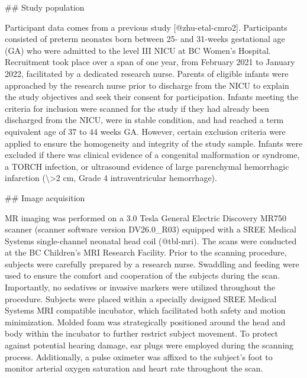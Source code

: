 \documentclass[
  letterpaper,
  DIV=11,
  numbers=noendperiod]{scrartcl}
\newenvironment{Shaded}{\begin{snugshade}}{\end{snugshade}}
\newcommand{\NormalTok}[1]{\textcolor[rgb]{0.00,0.23,0.31}{#1}}
\begin{document}
\begin{Shaded}
\begin{Highlighting}[]
\NormalTok{\#\# Study population}

\NormalTok{Participant data comes from a previous study [@zhu{-}etal{-}cmro2]. Participants consisted of preterm neonates born between 25{-} and 31{-}weeks gestational age (GA) who were admitted to the level III NICU at BC Women’s Hospital. Recruitment took place over a span of one year, from February 2021 to January 2022, facilitated by a dedicated research nurse. Parents of eligible infants were approached by the research nurse prior to discharge from the NICU to explain the study objectives and seek their consent for participation. Infants meeting the criteria for inclusion were scanned for the study if they had already been discharged from the NICU, were in stable condition, and had reached a term equivalent age of 37 to 44 weeks GA. However, certain exclusion criteria were applied to ensure the homogeneity and integrity of the study sample. Infants were excluded if there was clinical evidence of a congenital malformation or syndrome, a TORCH infection, or ultrasound evidence of large parenchymal hemorrhagic infarction (\textbackslash{}\textgreater{}2 cm, Grade 4 intraventricular hemorrhage).}

\NormalTok{\#\# Image acquisition}

\NormalTok{MR imaging was performed on a 3.0 Tesla General Electric Discovery MR750 scanner (scanner software version DV26.0\_R03) equipped with a SREE Medical Systems single{-}channel neonatal head coil (@tbl{-}mri). The scans were conducted at the BC Children’s MRI Research Facility. Prior to the scanning procedure, subjects were carefully prepared by a research nurse. Swaddling and feeding were used to ensure the comfort and cooperation of the subjects during the scan. Importantly, no sedatives or invasive markers were utilized throughout the procedure. Subjects were placed within a specially designed SREE Medical Systems MRI compatible incubator, which facilitated both safety and motion minimization. Molded foam was strategically positioned around the head and body within the incubator to further restrict subject movement. To protect against potential hearing damage, ear plugs were employed during the scanning process. Additionally, a pulse oximeter was affixed to the subject’s foot to monitor arterial oxygen saturation and heart rate throughout the scan.}


\end{Highlighting}
\end{Shaded}
\end{document}
